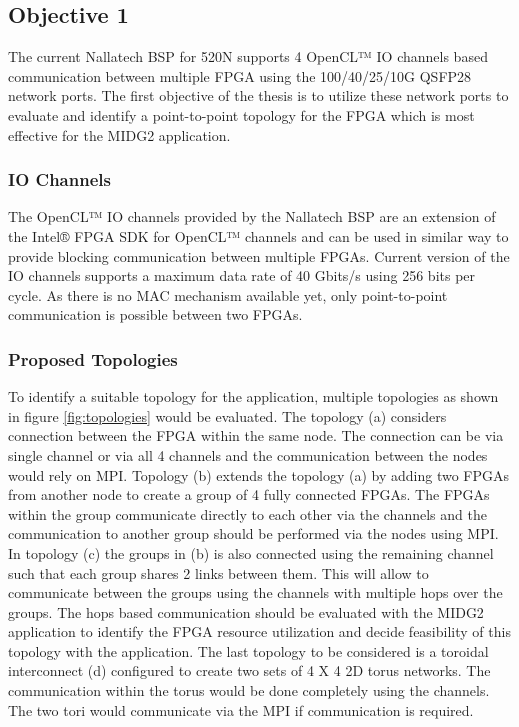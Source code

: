\documentclass[english,notitlepage]{hgbreport}
\begin{document}
\subsection{Objective 1}

The current Nallatech BSP for 520N supports 4 OpenCL™ IO channels based communication between
multiple FPGA using the 100/40/25/10G QSFP28 network ports. The first objective of
the thesis is to utilize these network ports to evaluate and identify a point-to-point
topology for the FPGA which is most effective for the MIDG2 application.

\subsubsection{IO Channels}

The OpenCL™ IO channels provided by the Nallatech BSP are an extension of the Intel® FPGA SDK for OpenCL™ channels \cite{noauthor_intel_2018}
and can be used in similar way to provide blocking communication between multiple FPGAs.
Current version of the IO channels supports a maximum data rate of 40 Gbits/s using 256 bits per cycle.
As there is no MAC mechanism available yet, only point-to-point communication is possible between
two FPGAs.

\subsubsection{Proposed Topologies}
\label{sub:topologies}

To identify a suitable topology for the application, multiple topologies
as shown in figure \ref{fig:topologies} would be evaluated. The topology (a)
considers connection between the FPGA within the same node. The connection can be via single channel
or via all 4 channels and the communication between the nodes would rely on MPI. Topology (b) extends
the topology (a) by adding two FPGAs from another node to create a group of 4 fully connected FPGAs.
The FPGAs within the group communicate directly to each other via the channels and the communication to another
group should be performed via the nodes using MPI. In topology (c) the groups in (b) is also connected using the
remaining channel such that each group shares 2 links between them. This will allow to communicate between
the groups using the channels with multiple hops over the groups. The hops based communication should be evaluated
with the MIDG2 application to identify the FPGA resource utilization and decide feasibility of this topology
with the application. The last topology to be considered is a toroidal interconnect (d) configured to create
two sets of 4 X 4 2D torus networks. The communication within the torus would be done completely using the channels.
The two tori would communicate via the MPI if communication is required.
\end{document}
